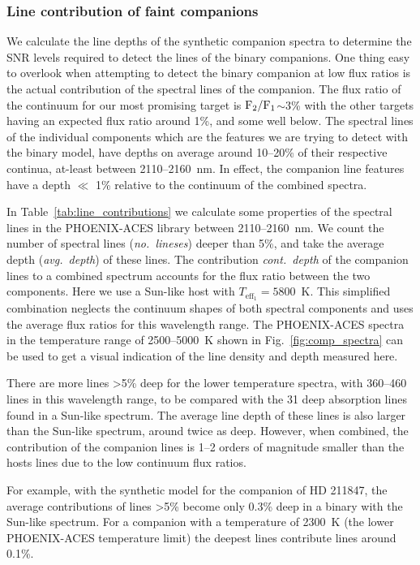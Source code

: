 \documentclass[fleqn,usenatbib]{mnras}
\begin{document}
\subsubsection{Line contribution of faint companions}
\label{subsubsec:line_contributions}
We calculate the line depths of the synthetic companion spectra to determine the SNR levels required to detect the lines of the binary companions.
One thing easy to overlook when attempting to detect the binary companion at low flux ratios is the actual contribution of the spectral lines of the companion. 
The flux ratio of the continuum for our most promising target is \(\rm F_2/F_1\)\(\sim\)3\% with the other targets having an expected flux ratio around 1\%, and some well below. The spectral lines of the individual components which are the features we are trying to detect with the binary model, have depths on average around 10--20\% of their respective continua,  at-least between 2110--2160~nm. In effect, the companion line features have a depth \(\ll\) 1\% relative to the continuum of the combined spectra. 

In Table~\ref{tab:line_contributions} we calculate some properties of the spectral lines in the PHOENIX-ACES library between 2110--2160~nm. We count the number of spectral lines (\emph{no.\ lineses}) deeper than 5\%, and take the average depth (\emph{avg.\ depth}) of these lines. The contribution \emph{cont.\ depth} of the companion lines to a combined spectrum accounts for the flux ratio between the two components. Here we use a Sun-like host with \(T_{\textrm{eff}_1}=5800\)~K. This simplified combination neglects the continuum shapes of both spectral components and uses the average flux ratios for this wavelength range. The PHOENIX-ACES spectra in the temperature range of 2500--5000~K shown in Fig.~\ref{fig:comp_spectra} can be used to get a visual indication of the line density and depth measured here.

There are more lines >5\% deep for the lower temperature spectra, with 360--460 lines in this wavelength range, to be compared with the 31 deep absorption lines found in a Sun-like spectrum. The average line depth of these lines is also larger than the Sun-like spectrum, around twice as deep. However, when combined, the contribution of the companion lines is 1--2 orders of magnitude smaller than the hosts lines due to the low continuum flux ratios. 

For example, with the synthetic model for the companion of {HD 211847}, the average contributions of lines >5\% become only 0.3\% deep in a binary with the Sun-like spectrum. For a companion with a temperature of 2300~K (the lower PHOENIX-ACES temperature limit) the deepest lines contribute lines around 0.1\%. 
\end{document}
